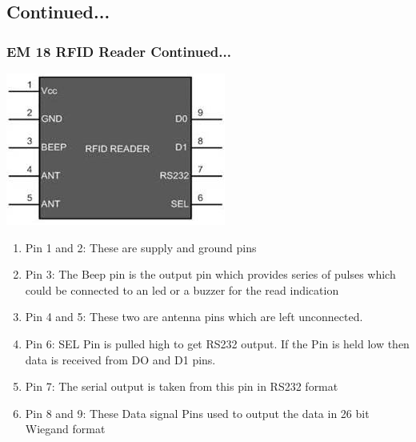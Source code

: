 \documentclass[table,10pt,red]{beamer}	%
\begin{document}
\subsection{Continued...} %
\begin{frame}
	\frametitle{ EM 18 RFID Reader Continued...}
	\begin{minipage}[c]{0.2\textwidth}
				\includegraphics[width=\linewidth]{rfidpin}
			\end{minipage}
		\pause
		\hfill
			\begin{minipage}[c]{0.75\textwidth}
				\begin{enumerate}
					\item <+-|alert@+> Pin 1 and 2: These are supply and ground pins
					\item <+-|alert@+> Pin 3: The Beep pin is the output pin which provides series of pulses which could be connected to an led or a buzzer for the read indication
					\item <+-|alert@+> Pin 4 and 5: These two are antenna pins which are left unconnected.
					\item <+-|alert@+> Pin 6: SEL Pin is pulled high to get RS232 output. If the Pin is held low then data is received from DO and D1 pins.
					\item <+-|alert@+> Pin 7: The serial output is taken from this pin in RS232 format
					\item <+-|alert@+> Pin 8 and 9: These Data signal Pins used to output the data in 26 bit Wiegand format 
				
					
				\end{enumerate}
			\end{minipage}   

\end{frame}
\end{document}
